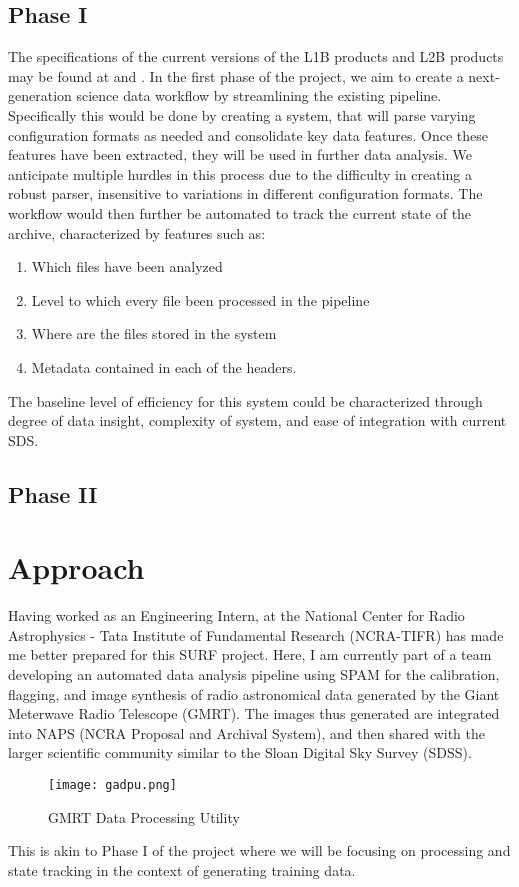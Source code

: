 \documentclass{article}
\begin{document}
\begin{multicols*}{2}
\subsection{Phase I}
The specifications of the current versions of the L1B products and L2B products may be found at \cite{L1B_data_product} and \cite{L2_data_product}. In the first phase of the project, we aim to create a next-generation science data workflow by streamlining the existing pipeline.
Specifically this would be done by creating a system, that will parse varying configuration formats as needed and consolidate key data features. Once these features have been extracted, they will be used in further data analysis. We anticipate multiple hurdles in this process due to the difficulty in creating a robust parser, insensitive to variations in different configuration formats. 
The workflow would then further be automated to track the current state of the archive, characterized by features such as:
\begin{enumerate}
\itemsep0em 
\item Which files have been analyzed
\item Level to which every file been processed in the pipeline
\item Where are the files stored in the system
\item Metadata contained in each of the headers.
\end{enumerate}

The baseline level of efficiency for this system could be characterized through degree of data insight, complexity of system, and ease of integration with current SDS.


\subsection{Phase II}

\section{Approach}
Having worked as an Engineering Intern, at the National Center for Radio Astrophysics - Tata Institute of Fundamental Research (NCRA-TIFR) has made me better prepared for this SURF project. Here, I am currently part of a team developing an automated data analysis pipeline using SPAM \cite{spam-intema} for the calibration, flagging, and image synthesis of radio astronomical data generated by the Giant Meterwave Radio Telescope (GMRT). The images thus generated are integrated into NAPS (NCRA Proposal and Archival System), and then shared with the larger scientific community similar to the Sloan Digital Sky Survey (SDSS).
\begin{figure}[H]
\centering
\texttt{[image: gadpu.png]}
\caption{GMRT Data Processing Utility}
\end{figure}
This is akin to Phase I of the project where we will be focusing on processing and state tracking in the context of generating training data.


\end{multicols*}
\end{document}
